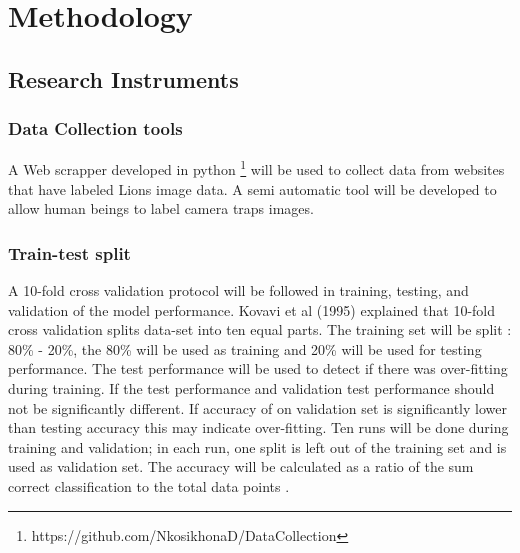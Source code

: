 \section{Methodology}\label{methodology}
\subsection{Research Instruments} %
\subsubsection{Data Collection tools}
A Web scrapper developed in python \footnote{https://github.com/NkosikhonaD/DataCollection} will be used to collect data from websites that have labeled Lions image data.  
 A semi automatic tool will be developed to allow human beings to label camera traps images. 
 
\subsubsection{Train-test split}
A 10-fold cross validation protocol will be followed in training, testing, and validation of the model performance. Kovavi et al (1995) \cite{kohavi1995study} explained that 10-fold cross validation splits data-set into ten equal parts. The training set will be split : 80\% - 20\%, the 80\% will be used as training and 20\% will be used for testing performance. The test performance will be used to detect if there was over-fitting during training. If the test performance and validation test performance should not be significantly different. If accuracy of on validation set is significantly lower than testing accuracy this may indicate over-fitting. Ten runs will be done during training and validation; in each run, one split is left out of the training set and is used as validation set. The accuracy will be calculated as a ratio of the sum correct classification to the total data points \cite{witten2016data}.

